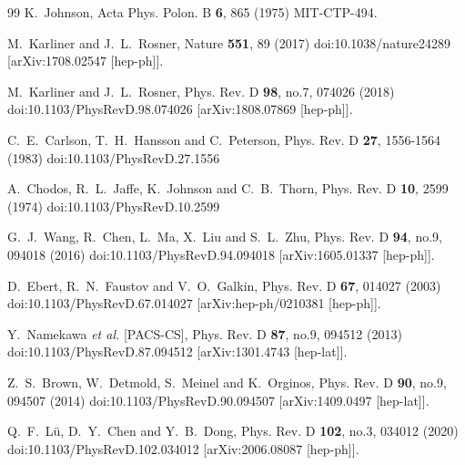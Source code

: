 \documentclass[prd,twocolumn,floatfix,nofootinbib]{revtex4}
\begin{document}
\begin{thebibliography}{99}
    K.~Johnson,
    Acta Phys. Polon. B \textbf{6}, 865 (1975)
    MIT-CTP-494.

    M.~Karliner and J.~L.~Rosner,
    Nature \textbf{551}, 89 (2017)
    doi:10.1038/nature24289
    [arXiv:1708.02547 [hep-ph]].

    M.~Karliner and J.~L.~Rosner,
    Phys. Rev. D \textbf{98}, no.7, 074026 (2018)
    doi:10.1103/PhysRevD.98.074026
    [arXiv:1808.07869 [hep-ph]].

    C.~E.~Carlson, T.~H.~Hansson and C.~Peterson,
    Phys. Rev. D \textbf{27}, 1556-1564 (1983)
    doi:10.1103/PhysRevD.27.1556

    A.~Chodos, R.~L.~Jaffe, K.~Johnson and C.~B.~Thorn,
    Phys. Rev. D \textbf{10}, 2599 (1974)
    doi:10.1103/PhysRevD.10.2599

    G.~J.~Wang, R.~Chen, L.~Ma, X.~Liu and S.~L.~Zhu,
    Phys. Rev. D \textbf{94}, no.9, 094018 (2016)
    doi:10.1103/PhysRevD.94.094018
    [arXiv:1605.01337 [hep-ph]].

    D.~Ebert, R.~N.~Faustov and V.~O.~Galkin,
    Phys. Rev. D \textbf{67}, 014027 (2003)
    doi:10.1103/PhysRevD.67.014027
    [arXiv:hep-ph/0210381 [hep-ph]].

    Y.~Namekawa \textit{et al.} [PACS-CS],
    Phys. Rev. D \textbf{87}, no.9, 094512 (2013)
    doi:10.1103/PhysRevD.87.094512
    [arXiv:1301.4743 [hep-lat]].

    Z.~S.~Brown, W.~Detmold, S.~Meinel and K.~Orginos,
    Phys. Rev. D \textbf{90}, no.9, 094507 (2014)
    doi:10.1103/PhysRevD.90.094507
    [arXiv:1409.0497 [hep-lat]].

    Q.~F.~L\"u, D.~Y.~Chen and Y.~B.~Dong,
    Phys. Rev. D \textbf{102}, no.3, 034012 (2020)
    doi:10.1103/PhysRevD.102.034012
    [arXiv:2006.08087 [hep-ph]].


\end{thebibliography}
\end{document}
